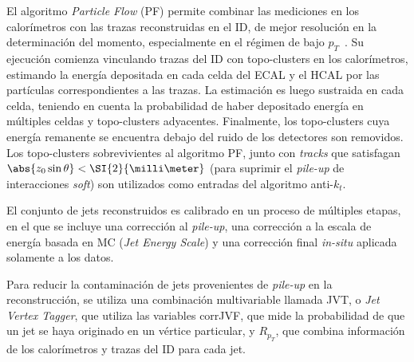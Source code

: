 El algoritmo \textit{Particle Flow} (PF) permite combinar las mediciones en los calorímetros con las trazas reconstruidas en el ID, de mejor resolución en la determinación del momento, especialmente en el régimen de bajo $p_T$~\cites[-7em][]{TheATLASCollaboration2017a}[-3em][]{TheATLASCollaboration2018}. Su ejecución comienza vinculando trazas del ID con topo-clusters en los calorímetros, estimando la energía depositada en cada celda del ECAL y el HCAL por las partículas correspondientes a las trazas. La estimación es luego sustraida en cada celda, teniendo en cuenta la probabilidad de haber depositado energía en múltiples celdas y topo-clusters adyacentes. Finalmente, los topo-clusters cuya energía remanente se encuentra debajo del ruido de los detectores son removidos. Los topo-clusters sobrevivientes al algoritmo PF, junto con \textit{tracks} que satisfagan $\abs{z_0 \sin\theta} < \SI{2}{\milli\meter}$ (para suprimir el \textit{pile-up} de interacciones \textit{soft}) son utilizados como entradas del algoritmo anti-$k_t$.

El conjunto de jets reconstruidos es calibrado en un proceso de múltiples etapas, en el que se incluye una corrección al \textit{pile-up}, una corrección a la escala de energía basada en MC (\textit{Jet Energy Scale}) y una corrección final \textit{in-situ} aplicada solamente a los datos.

Para reducir la contaminación de jets provenientes de \textit{pile-up} en la reconstrucción, se utiliza una combinación multivariable llamada JVT, o \textit{Jet Vertex Tagger}, que utiliza las variables corrJVF, que mide la probabilidad de que un jet se haya originado en un vértice particular, y $R_{p_T}$, que combina información de los calorímetros y trazas del ID para cada jet.


